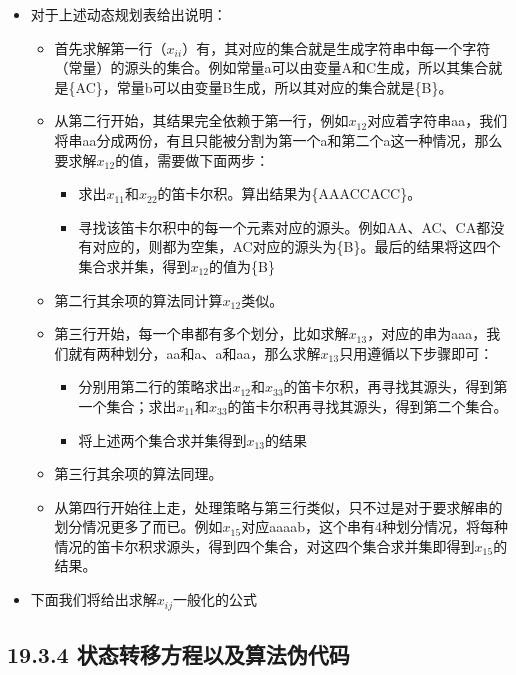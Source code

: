 \begin{itemize}
\item
  对于上述动态规划表给出说明：

  \begin{itemize}
  \item
    首先求解第一行（\(x_{ii}\)）有，其对应的集合就是生成字符串中每一个字符（常量）的源头的集合。例如常量a可以由变量A和C生成，所以其集合就是\{A\textbar C\}，常量b可以由变量B生成，所以其对应的集合就是\{B\}。
  \item
    从第二行开始，其结果完全依赖于第一行，例如\(x_{12}\)对应着字符串aa，我们将串aa分成两份，有且只能被分割为第一个a和第二个a这一种情况，那么要求解\(x_{12}\)的值，需要做下面两步：

    \begin{itemize}
    \item
      求出\(x_{11}\)和\(x_{22}\)的笛卡尔积。算出结果为\{AA\textbar AC\textbar CA\textbar CC\}。
    \item
      寻找该笛卡尔积中的每一个元素对应的源头。例如AA、AC、CA都没有对应的，则都为空集，AC对应的源头为\{B\}。最后的结果将这四个集合求并集，得到\(x_{12}\)的值为\{B\}
    \end{itemize}
  \item
    第二行其余项的算法同计算\(x_{12}\)类似。
  \item
    第三行开始，每一个串都有多个划分，比如求解\(x_{13}\)，对应的串为aaa，我们就有两种划分，aa和a、a和aa，那么求解\(x_{13}\)只用遵循以下步骤即可：

    \begin{itemize}
    \item
      分别用第二行的策略求出\(x_{12}\)和\(x_{33}\)的笛卡尔积，再寻找其源头，得到第一个集合；求出\(x_{11}\)和\(x_{33}\)的笛卡尔积再寻找其源头，得到第二个集合。
    \item
      将上述两个集合求并集得到\(x_{13}\)的结果
    \end{itemize}
  \item
    第三行其余项的算法同理。
  \item
    从第四行开始往上走，处理策略与第三行类似，只不过是对于要求解串的划分情况更多了而已。例如\(x_{15}\)对应aaaab，这个串有4种划分情况，将每种情况的笛卡尔积求源头，得到四个集合，对这四个集合求并集即得到\(x_{15}\)的结果。
  \end{itemize}
\item
  下面我们将给出求解\(x_{ij}\)一般化的公式
\end{itemize}

\subsection{19.3.4 状态转移方程以及算法伪代码}\label{header-n1277}

